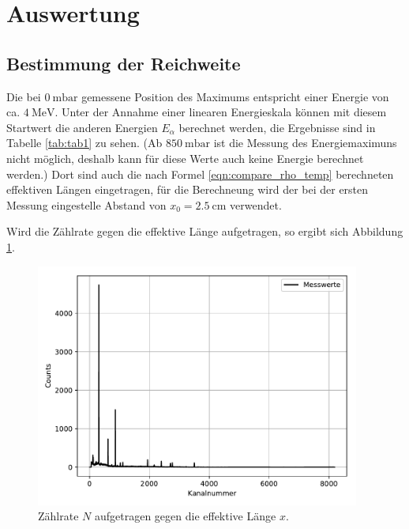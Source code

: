 \section{Auswertung}
\label{sec:Auswertung}

\subsection{Bestimmung der Reichweite}

Die bei $\SI{0}{\milli\bar}$ gemessene Position des Maximums entspricht einer
Energie von ca. $\SI{4}{\MeV}$. Unter der Annahme einer linearen
Energieskala können mit diesem Startwert die anderen Energien $E_{\alpha}$
berechnet werden, die Ergebnisse sind in Tabelle \ref{tab:tab1} zu sehen.
(Ab $\SI{850}{\milli\bar}$ ist die Messung des Energiemaximuns nicht möglich, deshalb kann
für diese Werte auch keine Energie berechnet werden.)
Dort sind auch die nach Formel \ref{eqn:compare_rho_temp} berechneten
effektiven Längen eingetragen, für die Berechneung wird der bei der
ersten Messung eingestelle Abstand von $x_0=\SI{2,5}{\cm}$ verwendet.



Wird die Zählrate gegen die effektive Länge aufgetragen, so ergibt sich
Abbildung \ref{fig:plot1}.

\begin{figure}[H]
  \centering
  \includegraphics[height=8cm]{plot1.pdf}
  \caption{Zählrate $N$ aufgetragen gegen die effektive Länge $x$.}
  \label{fig:plot1}
\end{figure}

